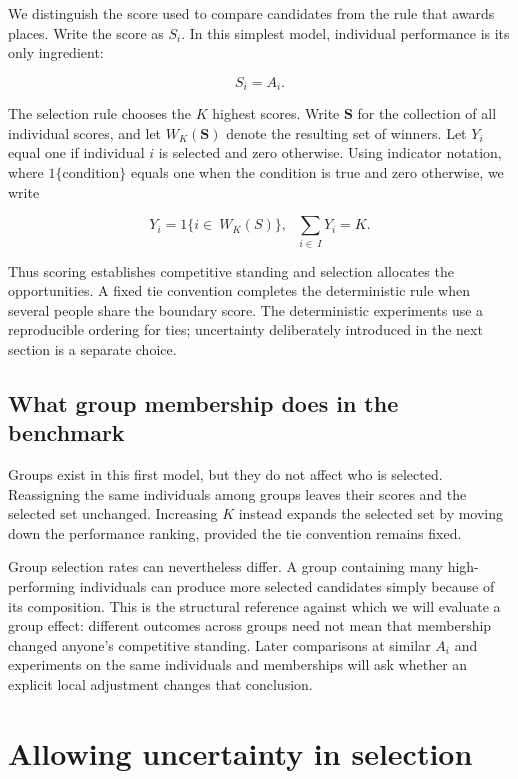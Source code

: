 We distinguish the score used to compare candidates from the rule that awards places. Write the score as \(S_{i}\). In this simplest model, individual performance is its only ingredient:

\[
S_{i} = A_{i}.
\]

The selection rule chooses the \(K\) highest scores. Write \(\mathbf S\) for the collection of all individual scores, and let \(W_K(\mathbf S)\) denote the resulting set of winners. Let \(Y_i\) equal one if individual \(i\) is selected and zero otherwise. Using indicator notation, where \(1\{\text{condition}\}\) equals one when the condition is true and zero otherwise, we write

\[
Y_{i} = 1\{ i \in \ W_{K}(S)\},\ \ \ \sum_{i \in \ I}Y_{i} = K.
\]

Thus scoring establishes competitive standing and selection allocates the opportunities. A fixed tie convention completes the deterministic rule when several people share the boundary score. The deterministic experiments use a reproducible ordering for ties; uncertainty deliberately introduced in the next section is a separate choice.

\subsection{What group membership does in the benchmark}\label{what-group-membership-does-in-the-benchmark}

Groups exist in this first model, but they do not affect who is selected. Reassigning the same individuals among groups leaves their scores and the selected set unchanged. Increasing \(K\) instead expands the selected set by moving down the performance ranking, provided the tie convention remains fixed.

Group selection rates can nevertheless differ. A group containing many high-performing individuals can produce more selected candidates simply because of its composition. This is the structural reference against which we will evaluate a group effect: different outcomes across groups need not mean that membership changed anyone's competitive standing. Later comparisons at similar \(A_{i}\) and experiments on the same individuals and memberships will ask whether an explicit local adjustment changes that conclusion.

\section{Allowing uncertainty in selection}\label{allowing-uncertainty-in-selection}

